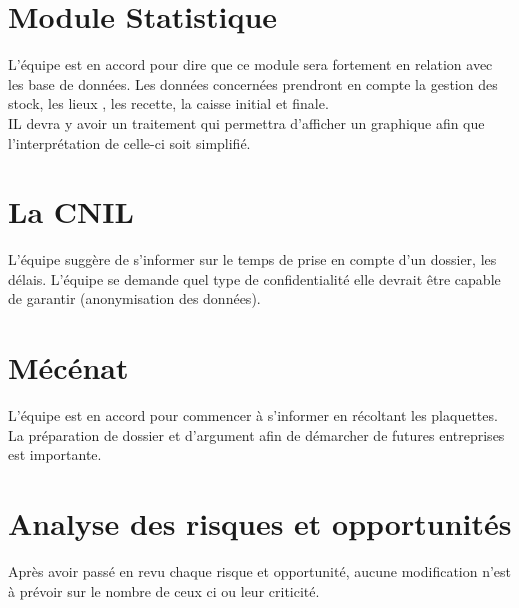 \documentclass [a4paper] {article}
\begin{document}
\section{Module Statistique}
L'équipe est en accord pour dire que ce module sera fortement en relation avec les base de données. Les données concernées prendront en compte la gestion des stock, les lieux , les recette, la caisse initial et finale. \\
IL devra y avoir un traitement  qui permettra d'afficher un graphique afin que l'interprétation de celle-ci soit simplifié.

\section{La CNIL}
L'équipe suggère de s'informer sur le temps de prise en compte d'un dossier, les délais. L'équipe se demande quel type de confidentialité elle devrait être capable de garantir (anonymisation des données).
\\

\section{Mécénat}

L'équipe est en accord pour commencer à s'informer en récoltant les plaquettes. La préparation de dossier et d'argument afin de démarcher de futures entreprises est importante.

\section{Analyse des risques et opportunités}
Après avoir passé en revu chaque risque et opportunité, aucune modification n'est à prévoir sur le nombre de ceux ci ou leur criticité.

\end{document}
